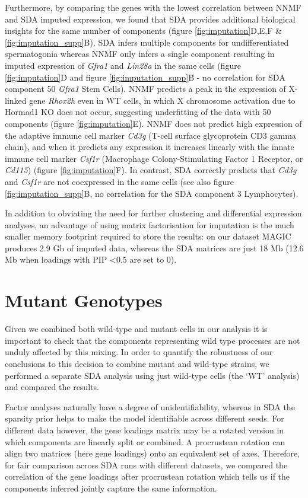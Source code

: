 Furthermore, by comparing the genes with the lowest correlation between NNMF and SDA imputed expression, we found that SDA provides additional biological insights for the same number of components (figure \ref{fig:imputation}D,E,F \& \ref{fig:imputation_supp}B). SDA infers multiple components for undifferentiated spermatogonia whereas NNMF only infers a single component resulting in imputed expression of \textit{Gfra1} and \textit{Lin28a} in the same cells (figure \ref{fig:imputation}D and figure \ref{fig:imputation_supp}B - no correlation for SDA component 50 \textit{Gfra1} Stem Cells). NNMF predicts a peak in the expression of X-linked gene \textit{Rhox2h} even in WT cells, in which X chromosome activation due to Hormad1 KO does not occur, suggesting underfitting of the data with 50 components (figure \ref{fig:imputation}E). NNMF does not predict high expression of the adaptive immune cell marker \textit{Cd3g} (T-cell surface glycoprotein CD3 gamma chain), and when it predicts any expression it increases linearly with the innate immune cell marker \textit{Csf1r} (Macrophage Colony-Stimulating Factor 1 Receptor, or \textit{Cd115}) (figure \ref{fig:imputation}F). In contrast, SDA correctly predicts that \textit{Cd3g} and \textit{Csf1r} are not coexpressed in the same cells (see also figure \ref{fig:imputation_supp}B, no correlation for the SDA component 3 Lymphocytes).

In addition to obviating the need for further clustering and differential expression analyses, an advantage of using matrix factorisation for imputation is the much smaller memory footprint required to store the results: on our dataset MAGIC produces 2.9 Gb of imputed data, whereas the SDA matrices are just 18 Mb (12.6 Mb when loadings with PIP <0.5 are set to 0).


\section{Mutant Genotypes}

Given we combined both wild-type and mutant cells in our analysis it is important to check that the components representing wild type processes are not unduly affected by this mixing. In order to quantify the robustness of our conclusions to this decision to combine mutant and wild-type strains, we performed a separate SDA analysis using just wild-type cells (the ‘WT’ analysis) and compared the results.

Factor analyses naturally have a degree of unidentifiability, whereas in SDA the sparsity prior helps to make the model identifiable across different seeds. For different data however, the gene loadings matrix may be a rotated version in which components are linearly split or combined. A procrustean rotation can align two matrices (here gene loadings) onto an equivalent set of axes. Therefore, for fair comparison across SDA runs with different datasets, we compared the correlation of the gene loadings after procrustean rotation which tells us if the components inferred jointly capture the same information.

